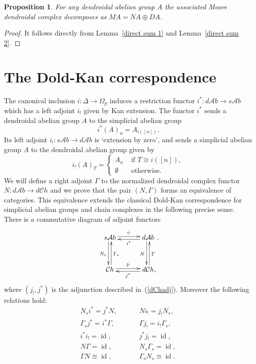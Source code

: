 \documentclass[a4paper]{amsart}
\theoremstyle{plain}
\newtheorem{prop}[thm]{Proposition}
\theoremstyle{definition}
\theoremstyle{remark}
\DeclareMathOperator{\id}{id}
\newcommand{\rpd}{\Omega_p}
\newcommand{\A}{\mathcal{A}b}
\newcommand{\Ch}{\mathcal{C}h}
\newcommand{\dCh}{d\mathcal{C}h}
\newcommand{\dAb}{d\mathcal{A}b}
\numberwithin{equation}{section}
\numberwithin{figure}{section}
\begin{document}
\begin{prop}\label{direct sum}
    For any dendroidal abelian group $A$ the associated Moore dendroidal complex decomposes as $MA=NA\oplus DA$.
\end{prop}
\begin{proof}
    It follows directly from Lemma~\ref{direct sum 1} and Lemma~\ref{direct sum 2}.
\end{proof}

\section{The Dold-Kan correspondence}
The canonical inclusion $i\colon\Delta\longrightarrow \rpd$ induces a restriction functor $i^*\colon \dAb\longrightarrow s\A$
which has a left adjoint $i_!$ given by Kan extension. The functor $i^*$ sends
a dendroidal abelian group $A$ to the simplicial abelian group
$$
    i^*(A)_n = A_{i([n])}.
$$
Its left adjoint $i_!\colon s\A \longrightarrow \dAb$ is `extension
by zero', and sends a simplicial abelian group $A$ to the dendroidal
abelian group given by
$$
    i_!(A)_T=\left\{
    \begin{array}{cc}
        A_n       & \mbox{ if $T\cong i([n])$}, \\
        \emptyset & \mbox{ otherwise}.
    \end{array}
    \right.
$$
We will define a right adjoint $\Gamma$ to the normalized dendroidal
complex functor $N\colon\dAb\longrightarrow \dCh$ and we prove that
the pair $(N,\Gamma)$ forms an equivalence of categories. This
equivalence extends the classical Dold-Kan correspondence for
simplicial abelian groups and chain complexes in the following precise sense. There is a
commutative diagram of adjoint functors
\[
    \xymatrix@R+3mm@C+3mm{ s\A\ar@<2pt>[r]^-{i_!}\ar@<-2pt>[d]_{N_s} &\dAb\ar@<-2pt>[d]_N\ar@<2pt>[l]^-{i^*} \\
    \Ch\ar@<2pt>[r]^-{j_!}\ar@<-2pt>[u]_{\Gamma_s}&\dCh{\rlap ,}\ar@<2pt>[l]^-{j^*}\ar@<-2pt>[u]_{\Gamma}}.
\]
where $(j_!, j^*)$ is the adjunction described in~(\ref{dChadj}). Moreover the following relations hold:
\[
    \begin{array}{ccccccc}
        N_s i^*=j^*N,           &  &  &  & Ni_!=j_!N_s,            \\
        \Gamma_s j^*=i^*\Gamma, &  &  &  & \Gamma j_!=i_!\Gamma_s, \\
        i^*i_!=\id,             &  &  &  & j^*j_!=\id,             \\
        N\Gamma=\id,            &  &  &  & N_s\Gamma_s=\id,        \\
        \Gamma N \cong \id,     &  &  &  & \Gamma_s N_s\cong \id.
    \end{array}
\]
\end{document}
